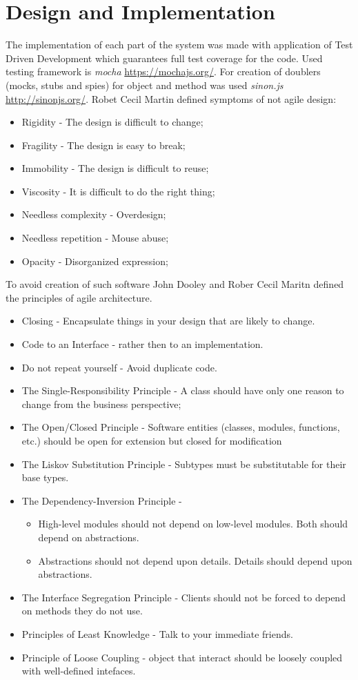 \chapter{Design and Implementation}
The implementation of each part of the system was made with application of Test Driven Development which guarantees full test coverage for the code. Used testing framework is \textit{mocha} \url{https://mochajs.org/}. For creation of doublers (mocks, stubs and spies) for object and method was used \textit{sinon.js }\url{http://sinonjs.org/}. 
Robet Cecil Martin\cite{MartinASD} defined symptoms of not agile design:
\begin{itemize}
	\item Rigidity - The design is difficult to change;
	\item Fragility - The design is easy to break;
	\item Immobility - The design is difficult to reuse;
	\item Viscosity - It is difficult to do the right thing;
	\item Needless complexity - Overdesign;
	\item Needless repetition - Mouse abuse;
	\item Opacity - Disorganized expression;
\end{itemize}
To avoid creation of such software John Dooley \cite{Dooley} and Rober Cecil Maritn \cite{MartinASD} defined  the principles of agile architecture.
\begin{itemize}
	\item Closing - Encapsulate things in your design that are likely to change.
	\item Code to an Interface - rather then to an implementation. 
	\item Do not repeat yourself - Avoid duplicate code.
	\item The Single-Responsibility Principle - A class should have only one reason to change from the business perspective;
	\item The Open/Closed Principle - Software entities (classes, modules, functions, etc.) should be open for extension but closed for modification
	\item The Liskov Substitution Principle - Subtypes must be substitutable for their base types.
	\item The Dependency-Inversion Principle - 		
	\begin{itemize}
		\item High-level modules should not depend on low-level modules.  Both should depend on abstractions. 
		\item Abstractions should not depend upon details. Details should depend upon abstractions.
	\end{itemize}
	\item The Interface Segregation Principle - Clients should not be forced to depend on methods they do not use.
	\item Principles of Least Knowledge - Talk to your immediate friends. 
	\item Principle of Loose Coupling - object that interact should be loosely coupled with well-defined intefaces.
\end{itemize}


